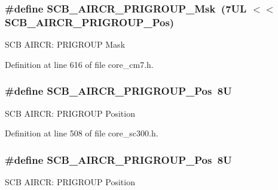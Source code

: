 \subsubsection[{\texorpdfstring{S\+C\+B\+\_\+\+A\+I\+R\+C\+R\+\_\+\+P\+R\+I\+G\+R\+O\+U\+P\+\_\+\+Msk}{SCB_AIRCR_PRIGROUP_Msk}}]{\setlength{\rightskip}{0pt plus 5cm}\#define S\+C\+B\+\_\+\+A\+I\+R\+C\+R\+\_\+\+P\+R\+I\+G\+R\+O\+U\+P\+\_\+\+Msk~(7\+U\+L $<$$<$ S\+C\+B\+\_\+\+A\+I\+R\+C\+R\+\_\+\+P\+R\+I\+G\+R\+O\+U\+P\+\_\+\+Pos)}\hypertarget{group___c_m_s_i_s___s_c_b_ga8be60fff03f48d0d345868060dc6dae7}{}\label{group___c_m_s_i_s___s_c_b_ga8be60fff03f48d0d345868060dc6dae7}
S\+CB A\+I\+R\+CR\+: P\+R\+I\+G\+R\+O\+UP Mask 

Definition at line 616 of file core\+\_\+cm7.\+h.

\subsubsection[{\texorpdfstring{S\+C\+B\+\_\+\+A\+I\+R\+C\+R\+\_\+\+P\+R\+I\+G\+R\+O\+U\+P\+\_\+\+Pos}{SCB_AIRCR_PRIGROUP_Pos}}]{\setlength{\rightskip}{0pt plus 5cm}\#define S\+C\+B\+\_\+\+A\+I\+R\+C\+R\+\_\+\+P\+R\+I\+G\+R\+O\+U\+P\+\_\+\+Pos~8U}\hypertarget{group___c_m_s_i_s___s_c_b_gaca155deccdeca0f2c76b8100d24196c8}{}\label{group___c_m_s_i_s___s_c_b_gaca155deccdeca0f2c76b8100d24196c8}
S\+CB A\+I\+R\+CR\+: P\+R\+I\+G\+R\+O\+UP Position 

Definition at line 508 of file core\+\_\+sc300.\+h.

\subsubsection[{\texorpdfstring{S\+C\+B\+\_\+\+A\+I\+R\+C\+R\+\_\+\+P\+R\+I\+G\+R\+O\+U\+P\+\_\+\+Pos}{SCB_AIRCR_PRIGROUP_Pos}}]{\setlength{\rightskip}{0pt plus 5cm}\#define S\+C\+B\+\_\+\+A\+I\+R\+C\+R\+\_\+\+P\+R\+I\+G\+R\+O\+U\+P\+\_\+\+Pos~8U}\hypertarget{group___c_m_s_i_s___s_c_b_gaca155deccdeca0f2c76b8100d24196c8}{}\label{group___c_m_s_i_s___s_c_b_gaca155deccdeca0f2c76b8100d24196c8}
S\+CB A\+I\+R\+CR\+: P\+R\+I\+G\+R\+O\+UP Position 

